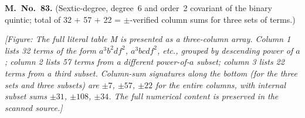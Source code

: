 \documentclass[11pt]{article}
\begin{document}
\medskip
\noindent\textbf{M.\ No.~83.} \quad (Sextic-degree, degree~6 and order~2 covariant of the binary quintic; total of 32 + 57 + 22 = $\pm$-verified column sums for three sets of terms.)

\medskip
\noindent\textit{[Figure: The full literal table M is presented as a three-column array. Column 1 lists 32 terms of the form $a^3 b^2 d f^2$, $a^3 b c d f^2$, etc., grouped by descending power of $a$; column 2 lists 57 terms from a different power-of-$a$ subset; column 3 lists 22 terms from a third subset. Column-sum signatures along the bottom (for the three sets and three subsets) are $\pm 7$, $\pm 57$, $\pm 22$ for the entire columns, with internal subset sums $\pm 31$, $\pm 108$, $\pm 34$. The full numerical content is preserved in the scanned source.]}
\end{document}
